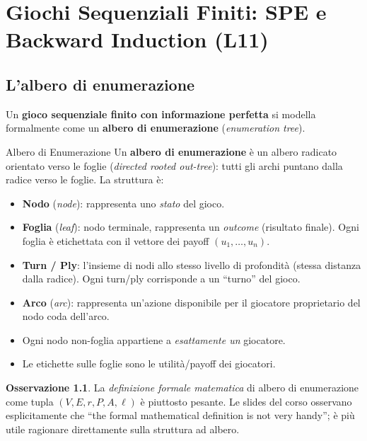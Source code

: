 \documentclass[12pt,a4paper,twoside]{book}
\theoremstyle{plain}
\theoremstyle{definition}
\newtheorem{remark}[theorem]{Osservazione}
\begin{document}
\chapter{Giochi Sequenziali Finiti: SPE e Backward Induction (L11)}
\label{ch:seq-finite}

\section{L'albero di enumerazione}

Un \textbf{gioco sequenziale finito con informazione perfetta} si modella formalmente come un \textbf{albero di enumerazione} (\emph{enumeration tree}).

\begin{defbox}{Albero di Enumerazione}
Un \textbf{albero di enumerazione} è un albero radicato orientato verso le foglie (\emph{directed rooted out-tree}): tutti gli archi puntano dalla radice verso le foglie. La struttura è:
\begin{itemize}
  \item \textbf{Nodo} (\emph{node}): rappresenta uno \emph{stato} del gioco.
  \item \textbf{Foglia} (\emph{leaf}): nodo terminale, rappresenta un \emph{outcome} (risultato finale). Ogni foglia è etichettata con il vettore dei payoff $(u_1,\dots,u_n)$.
  \item \textbf{Turn / Ply}: l'insieme di nodi allo stesso livello di profondità (stessa distanza dalla radice). Ogni turn/ply corrisponde a un ``turno'' del gioco.
  \item \textbf{Arco} (\emph{arc}): rappresenta un'azione disponibile per il giocatore proprietario del nodo coda dell'arco.
  \item Ogni nodo non-foglia appartiene a \emph{esattamente un} giocatore.
  \item Le etichette sulle foglie sono le utilità/payoff dei giocatori.
\end{itemize}
\end{defbox}

\begin{remark}
La \emph{definizione formale matematica} di albero di enumerazione come tupla $(V, E, r, P, A, \ell)$ è piuttosto pesante. Le slides del corso osservano esplicitamente che ``the formal mathematical definition is not very handy''; è più utile ragionare direttamente sulla struttura ad albero.
\end{remark}
\end{document}
